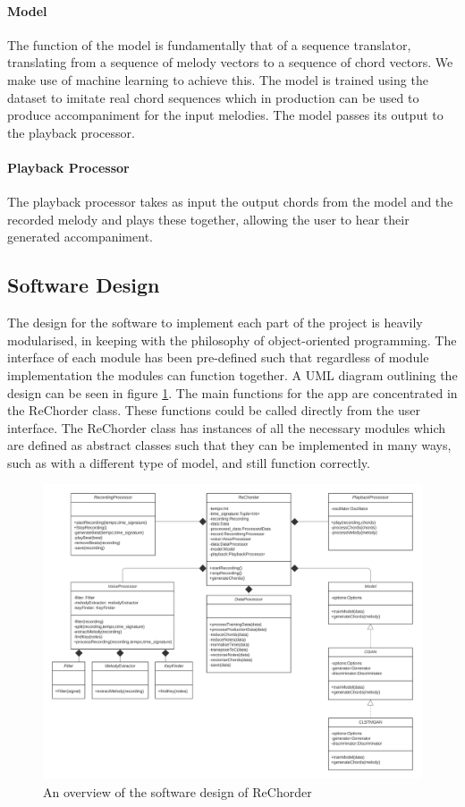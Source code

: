 \paragraph{Model}

The function of the model is fundamentally that of a sequence translator, translating from a sequence of melody vectors to a sequence of chord vectors.
We make use of machine learning to achieve this. 
The model is trained using the dataset to imitate real chord sequences which in production can be used to produce accompaniment for the input melodies.
The model passes its output to the playback processor.
\paragraph{Playback Processor}

The playback processor takes as input the output chords from the model and the recorded melody and plays these together, allowing the user to hear their generated accompaniment.

\subsection{Software Design}

The design for the software to implement each part of the project is heavily modularised, in keeping with the philosophy of object-oriented programming.
The interface of each module has been pre-defined such that regardless of module implementation the modules can function together. 
A UML diagram outlining the design can be seen in figure \ref{fig:SoftwareOverview}.
The main functions for the app are concentrated in the ReChorder class.
These functions could be called directly from the user interface.
The ReChorder class has instances of all the necessary modules which are defined as abstract classes such that they can be implemented in many ways, such as with a different type of model, and still function correctly.

\begin{figure}
    \centering
    \includegraphics[width=0.8\columnwidth]{Figures/SoftwareOverview}
    \decoRule
    \caption[]{An overview of the software design of ReChorder}
    \label{fig:SoftwareOverview}
\end{figure}


